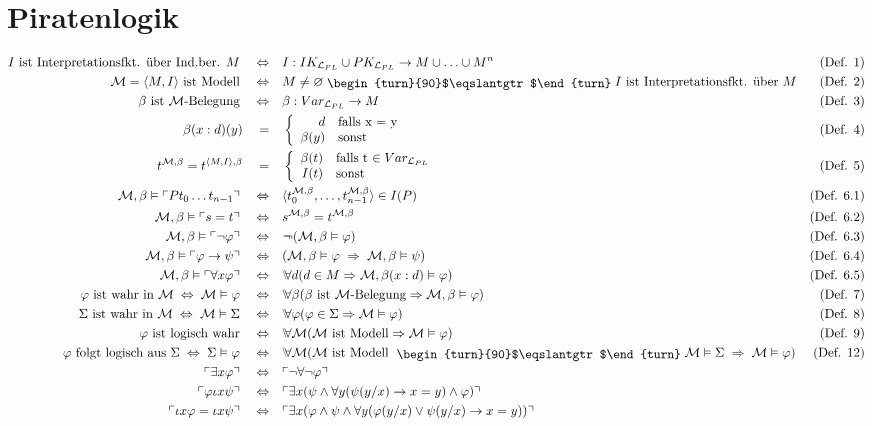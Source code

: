 \documentclass{scrartcl}
\newcommand{\gdw}{\quad\Leftrightarrow\quad &}
\renewcommand{\phi}{\varphi}
\newcommand{\q}[1]{\ulcorner #1 \urcorner}
\newcommand{\pfeil}{\rightarrow}
\newcommand{\Pfeil}{\Rightarrow}
\newcommand{\nach}[1]{& \text{(#1)} \\}
\newcommand{\MM}{\mathcal{M}}
\newcommand{\LL}{\mathcal{L}}
\newcommand{\Forall}{\raisebox{0.15em}{\scalebox{0.72}{$\backslash$}}\hspace{-0.18em}\forall}
\newcommand{\Exists}{\exists\hspace{-0.45em}\exists}
\newcommand{\Neg}{\neg\hspace{-0.5em}\neg}
\newcommand{\Land}{\;\raisebox{-0.12em}{\begin{turn}{90}$\eqslantgtr$\end{turn}}\;}
\begin{document}
\section{Piratenlogik}
\begin{align*}
I \text{ ist Interpretationsfkt. über Ind.ber. } M \gdw I : IK_{\LL_{PL}} \cup PK_{\LL_{PL}} \pfeil M \cup \dotsc \cup M^n \nach{Def. 1}
\MM = \langle M, I \rangle \text{ ist Modell} \gdw M \neq \varnothing \Land I \text{ ist Interpretationsfkt. über } M \nach{Def. 2}
\beta \text{ ist $\MM$-Belegung} \gdw \beta : Var_{\LL_{PL}} \to M \nach{Def. 3}
\beta(x:d)(y) \quad = \quad & \left\{ \begin{array}{rl}
d & \mbox{falls x = y} \\
\beta(y) & \mbox{sonst} \end{array} \right. \nach{Def. 4}
t^{\MM, \beta} = t^{\langle M, I\rangle, \beta} \quad = \quad & \left\{ \begin{array}{rl}
\beta(t) & \mbox{falls t $\in Var_{\LL_{PL}}$} \\
I(t) & \mbox{sonst} \end{array} \right. \nach{Def. 5}
\MM, \beta \vDash \q{Pt_0\dotsc t_{n-1}} \gdw \langle t_0^{\MM, \beta}, \dotsc, t_{n-1}^{\MM, \beta}\rangle \in I(P) \nach{Def. 6.1}
\MM, \beta \vDash \q{s=t} \gdw s^{\MM, \beta} = t^{\MM, \beta} \nach{Def. 6.2}
\MM, \beta \vDash \q{\neg \phi} \gdw \Neg (\MM, \beta \vDash \phi) \nach{Def. 6.3}
\MM, \beta \vDash \q{\phi \pfeil \psi} \gdw (\MM, \beta \vDash \phi \;\Pfeil\; \MM, \beta \vDash \psi) \nach{Def. 6.4}
\MM, \beta \vDash \q{\forall x \phi} \gdw \Forall d(d \in M \Pfeil \MM, \beta(x:d) \vDash \phi) \nach{Def. 6.5}
\phi \text{ ist wahr in } \MM \;\Leftrightarrow\; \MM\vDash\phi \gdw \Forall\beta(\beta \text{ ist $\MM$-Belegung} \Pfeil \MM, \beta \vDash \phi) \nach{Def. 7}
\Sigma \text{ ist wahr in } \MM \;\Leftrightarrow\; \MM\vDash\Sigma \gdw \Forall\phi(\phi\in\Sigma \Pfeil \MM\vDash\phi) \nach{Def. 8}
\phi \text{ ist logisch wahr} \gdw \Forall\MM(\MM \text{ ist Modell} \Pfeil \MM\vDash\phi) \nach{Def. 9}
\phi \text{ folgt logisch aus } \Sigma \;\Leftrightarrow\; \Sigma \vDash \phi \gdw \Forall\MM(\MM \text{ ist Modell } \Land \MM \vDash \Sigma \;\Pfeil\; \MM \vDash \phi) \nach{Def. 12}
\q{\exists x \phi} \gdw \q{\neg\forall\neg\phi} \\
\q{\phi\iota x \psi} \gdw \q{\exists x(\psi\land\forall y(\psi(y/x)\pfeil x=y) \land \phi)} \\
\q{\iota x \phi = \iota x \psi} \gdw \q{\exists x(\phi\land\psi\land\forall y(\phi(y/x)\lor\psi(y/x)\pfeil x=y))}
\end{align*}
\end{document}
